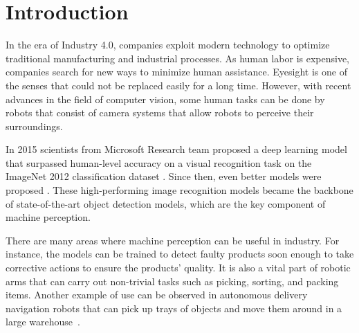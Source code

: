 \chapter{Introduction}

In the era of Industry 4.0, companies exploit modern technology to optimize traditional manufacturing and industrial processes. As human labor is expensive, companies search for new ways to minimize human assistance. Eyesight is one of the senses that could not be replaced easily for a long time. However, with recent advances in the field of computer vision, some human tasks can be done by robots that consist of camera systems that allow robots to perceive their surroundings. 

In 2015 scientists from Microsoft Research team proposed a deep learning model that surpassed human-level accuracy on a visual recognition task on the ImageNet 2012 classification dataset \cite{surp2015}. Since then, even better models were proposed \cite{resnet, efficientnet}. These high-performing image recognition models became the backbone of state-of-the-art object detection models, which are the key component of machine perception.

There are many areas where machine perception can be useful in industry. For instance, the models can be trained to detect faulty products soon enough to take corrective actions to ensure the products' quality. It is also a vital part of robotic arms that can carry out non-trivial tasks such as picking, sorting, and packing items. Another example of use can be observed in autonomous delivery navigation robots that can pick up trays of objects and move them around in a large warehouse~\cite{bmw}. 